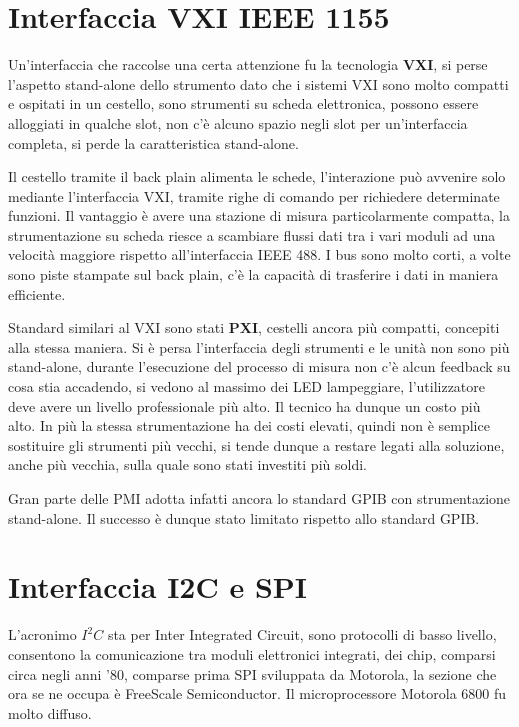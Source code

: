 \section{Interfaccia VXI IEEE 1155}
Un'interfaccia che raccolse una certa attenzione fu la tecnologia \textbf{VXI},
si perse l'aspetto stand-alone dello strumento dato che i sistemi VXI sono molto
compatti e ospitati in un cestello, sono strumenti su scheda elettronica,
possono essere alloggiati in qualche slot, non c'è alcuno spazio negli slot per
un'interfaccia completa, si perde la caratteristica stand-alone.

Il cestello tramite il back plain alimenta le schede, l'interazione può
avvenire solo mediante l'interfaccia VXI, tramite righe di comando per
richiedere determinate funzioni.
Il vantaggio è avere una stazione di misura particolarmente compatta, la
strumentazione su scheda riesce a scambiare flussi dati tra i vari moduli ad
una velocità maggiore rispetto all'interfaccia IEEE 488.
I bus sono molto corti, a volte sono piste stampate sul back plain, c'è la
capacità di trasferire i dati in maniera efficiente.

Standard similari al VXI sono stati \textbf{PXI}, cestelli ancora più compatti,
concepiti alla stessa maniera.
Si è persa l'interfaccia degli strumenti e le unità non sono più stand-alone,
durante l'esecuzione del processo di misura non c'è alcun feedback su cosa stia
accadendo, si vedono al massimo dei LED lampeggiare, l'utilizzatore deve avere
un livello professionale più alto.
Il tecnico ha dunque un costo più alto.
In più la stessa strumentazione ha dei costi elevati, quindi non è semplice
sostituire gli strumenti più vecchi, si tende dunque a restare legati alla
soluzione, anche più vecchia, sulla quale sono stati investiti più soldi.

Gran parte delle PMI adotta infatti ancora lo standard GPIB con strumentazione
stand-alone.
Il successo è dunque stato limitato rispetto allo standard GPIB.

\section{Interfaccia I2C e SPI}
L'acronimo \textbf{$I^2C$} sta per Inter Integrated Circuit, sono protocolli di
basso livello, consentono la comunicazione tra moduli elettronici integrati,
dei chip, comparsi circa negli anni '80, comparse prima SPI sviluppata da
Motorola, la sezione che ora se ne occupa è FreeScale Semiconductor.
Il microprocessore Motorola 6800 fu molto diffuso.

